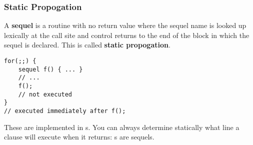 \documentclass[12pt]{article}
\begin{document}
\subsubsection{Static Propogation}
A {\bf sequel} is a routine with no return value where the sequel name is looked up lexically at the call site and control returns to the end of the block in which the sequel is declared. This is called {\bf static propogation}.

\begin{verbatim}
for(;;) {
    sequel f() { ... }
    // ...
    f();
    // not executed
}
// executed immediately after f();
\end{verbatim}

These are implemented in s. You can always determine statically what line a  clause will execute when it returns: s are sequels.
\end{document}
